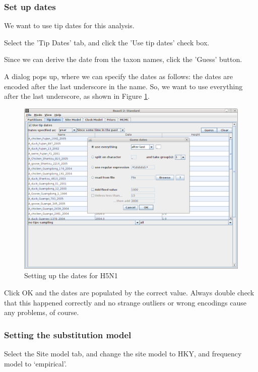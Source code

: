 \documentclass{article}
\begin{document}
\subsubsection*{Set up dates}

We want to use tip dates for this analysis.

Select the 'Tip Dates' tab, and click the 'Use tip dates' check box.

Since we can derive the date from the taxon names, click the 'Guess' button.

A dialog pops up, where we can specify the dates as follows: the dates are encoded after the last underscore in the name.
So, we want to use everything after the last underscore, as shown in Figure \ref{fig.dates}.

\begin{figure}
\includegraphics[scale=0.4]{figures/BEAUti_dates.png}
\caption{\label{fig.dates}Setting up the dates for H5N1}
\end{figure}

Click OK and the dates are populated by the correct value. Always double check that this happened correctly and no strange outliers or wrong encodings cause any problems, of course.

\subsubsection*{Setting the substitution model}

Select the Site model tab, and change the site model to HKY, and frequency model to `empirical'.
\end{document}
